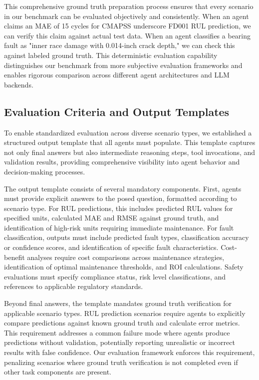 \documentclass[conference]{IEEEtran}
\begin{document}
This comprehensive ground truth preparation process ensures that every scenario in our benchmark can be evaluated objectively and consistently. When an agent claims an MAE of 15 cycles for CMAPSS underscore FD001 RUL prediction, we can verify this claim against actual test data. When an agent classifies a bearing fault as "inner race damage with 0.014-inch crack depth," we can check this against labeled ground truth. This deterministic evaluation capability distinguishes our benchmark from more subjective evaluation frameworks and enables rigorous comparison across different agent architectures and LLM backends.

\subsection{Evaluation Criteria and Output Templates}

To enable standardized evaluation across diverse scenario types, we established a structured output template that all agents must populate. This template captures not only final answers but also intermediate reasoning steps, tool invocations, and validation results, providing comprehensive visibility into agent behavior and decision-making processes.

The output template consists of several mandatory components. First, agents must provide explicit answers to the posed question, formatted according to scenario type. For RUL predictions, this includes predicted RUL values for specified units, calculated MAE and RMSE against ground truth, and identification of high-risk units requiring immediate maintenance. For fault classification, outputs must include predicted fault types, classification accuracy or confidence scores, and identification of specific fault characteristics. Cost-benefit analyses require cost comparisons across maintenance strategies, identification of optimal maintenance thresholds, and ROI calculations. Safety evaluations must specify compliance status, risk level classifications, and references to applicable regulatory standards.

Beyond final answers, the template mandates ground truth verification for applicable scenario types. RUL prediction scenarios require agents to explicitly compare predictions against known ground truth and calculate error metrics. This requirement addresses a common failure mode where agents produce predictions without validation, potentially reporting unrealistic or incorrect results with false confidence. Our evaluation framework enforces this requirement, penalizing scenarios where ground truth verification is not completed even if other task components are present.
\end{document}
